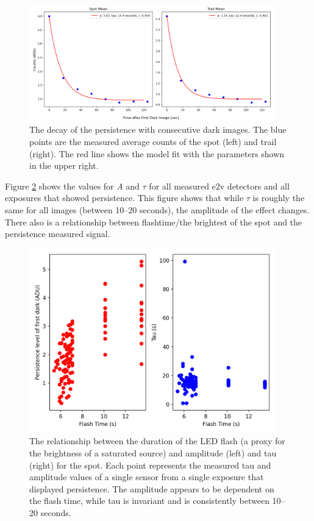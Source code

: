 \documentclass[DM,authoryear,toc]{lsstdoc}
\begin{document}
\begin{figure}[!ht]
  \centering
  \includegraphics[width=0.95\textwidth, angle=0]{Run6_decay_2.png}
  \caption{
  The decay of the persistence with consecutive dark images. 
  The blue points are the measured average counts of the spot (left) and trail (right).
  The red line shows the model fit with the parameters shown in the upper right.
  }\label{fig:Run6_decay}
\end{figure}

Figure \ref{fig:Pers_Flash_Tau} shows the values for \textit{A} and \textit{$\tau$} for all measured e2v detectors and all exposures that showed persistence. 
This figure shows that while \textit{$\tau$} is roughly the same for all images (between 10--20 seconds), the amplitude of the effect changes.
There also is a relationship between flashtime/the brightest of the spot and the persistence measured signal.

\begin{figure}[!ht]
  \centering
  \includegraphics[width=0.95\textwidth, angle=0]{Persistence_Flash_Tau.png}
  \caption{
  The relationship between the duration of the LED flash (a proxy for the brightness of a saturated source) and amplitude (left) and tau (right) for the spot.
  Each point represents the measured tau and amplitude values of a single sensor from a single exposure that displayed persistence.
  The amplitude appears to be dependent on the flash time, while tau is invariant and is consistently between 10--20 seconds. 
  }\label{fig:Pers_Flash_Tau}
\end{figure}
\end{document}
